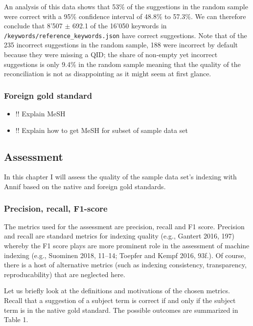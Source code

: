 An analysis of this data shows that 53\% of the suggestions in the
random sample were correct with a 95\% confidence interval of 48.8\% to
57.3\%. We can therefore conclude that 8'507 \(\pm\) 692.1 of the 16'050
keywords in \texttt{/keywords/reference\_keywords.json} have correct
suggestions. Note that of the 235 incorrect suggestions in the random
sample, 188 were incorrect by default because they were missing a QID;
the share of non-empty yet incorrect suggestions is only 9.4\% in the
random sample meaning that the quality of the reconciliation is not as
disappointing as it might seem at first glance.

\hypertarget{foreign-gold-standard}{%
\subsubsection{Foreign gold standard}\label{foreign-gold-standard}}

\begin{itemize}
\tightlist
\item
  !! Explain MeSH
\item
  !! Explain how to get MeSH for subset of sample data set
\end{itemize}

\hypertarget{assessment}{%
\subsection{Assessment}\label{assessment}}

In this chapter I will assess the quality of the sample data set's
indexing with Annif based on the native and foreign gold standards.

\hypertarget{precision-recall-f1-score}{%
\subsubsection{Precision, recall,
F1-score}\label{precision-recall-f1-score}}

The metrics used for the assessment are precision, recall and F1 score.
Precision and recall are standard metrics for indexing quality (e.g.,
Gantert 2016, 197) whereby the F1 score plays are more prominent role in
the assessment of machine indexing (e.g., Suominen 2018, 11--14; Toepfer
and Kempf 2016, 93f.). Of course, there is a host of alternative metrics
(such as indexing consistency, transparency, reproducability) that are
neglected here.

Let us briefly look at the definitions and motivations of the chosen
metrics. Recall that a suggestion of a subject term is correct if and
only if the subject term is in the native gold standard. The possible
outcomes are summarized in Table 1.

